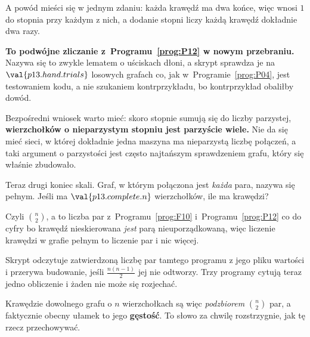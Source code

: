 \begin{fr}
A powód mieści się w jednym zdaniu: każda krawędź ma dwa końce, więc wnosi $1$
do stopnia przy każdym z nich, a dodanie stopni liczy każdą krawędź dokładnie
dwa razy.

\textbf{To podwójne zliczanie z~Programu~\ref{prog:P12} w nowym przebraniu.}
Nazywa się to zwykle lematem o uściskach dłoni, a skrypt sprawdza je na
$\val{p13.hand.trials}$ losowych grafach \dash{} co, jak
w~Programie~\ref{prog:P04}, jest testowaniem kodu, a nie szukaniem
kontrprzykładu, bo kontrprzykład obaliłby dowód.

\begin{note}
Bezpośredni wniosek warto mieć: skoro stopnie sumują się do liczby parzystej,
\textbf{wierzchołków o nieparzystym stopniu jest parzyście wiele.} Nie da się
mieć sieci, w której dokładnie jedna maszyna ma nieparzystą liczbę połączeń, a
taki argument o parzystości jest często najtańszym sprawdzeniem grafu, który
się właśnie zbudowało.
\end{note}
\end{fr}

\begin{fr}
Teraz drugi koniec skali. Graf, w którym połączona jest \emph{każda} para,
nazywa się pełnym. Jeśli ma $\val{p13.complete.n}$ wierzchołków, ile ma
krawędzi?
\nextframe
\end{fr}

\begin{fr}
Czyli $\binom{n}{2}$, a to liczba par z~Programu~\ref{prog:F10}
i~Programu~\ref{prog:P12} co do cyfry \dash{} bo krawędź nieskierowana
\emph{jest} parą nieuporządkowaną, więc liczenie krawędzi w grafie pełnym to
liczenie par i nic więcej.

\begin{note}
Skrypt odczytuje zatwierdzoną liczbę par tamtego programu z jego pliku
wartości i przerywa budowanie, jeśli $\frac{n(n-1)}{2}$ jej nie odtworzy. Trzy
programy cytują teraz jedno obliczenie i żaden nie może się rozjechać.
\end{note}

Krawędzie dowolnego grafu o $n$ wierzchołkach są więc \emph{podzbiorem}
$\binom{n}{2}$ par, a faktycznie obecny ułamek to jego \textbf{gęstość}. To
słowo za chwilę rozstrzygnie, jak tę rzecz przechowywać.
\end{fr}

